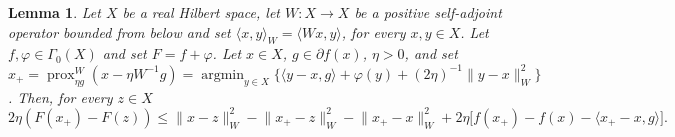 \documentclass[10pt,a4paper]{amsart}
\newtheorem{lemma}{Lemma}
\newcommand{\HH}{X}
\newcommand{\R}{\mathbb{R}}
\newcommand{\W}{W}
\DeclareMathOperator*{\argmin}{argmin}
\newcommand{\norm}[1]{\lVert{#1}\rVert}
\newcommand{\pair}[2]{{\langle{{#1},{#2}}\rangle}}
\DeclareMathOperator{\prox}{prox}
\newcommand{\reg}{\varphi}
\newcommand{\scalarp}[1]{\langle{#1}\rangle}
\newcommand{\uu}{g}
\newcommand{\x}{x}
\newcommand{\y}{y}
\begin{document}
\begin{lemma}
\label{lem:basicPGstep}
Let $X$ be a real Hilbert space,
let $\W\colon \HH\to \HH$ be a positive self-adjoint operator bounded from below and set
$\scalarp{\x,\y}_{\W} = \scalarp{\W\x,\y}$, for every $\x,\y\in \HH$.
Let $f,\reg\in \Gamma_0(X)$ and set $F = f+\reg$.
Let $x \in X$, $\uu \in \partial f(x)$, $\eta>0$, and set 
$x_+ = \prox^\W_{\eta g}(x - \eta \W^{-1}\uu) = \argmin_{\y\in \HH} \big\{ \scalarp{\y-\x, \uu} + \reg(\y)+ (2\eta)^{-1}\norm{\y-\x}_{\W}^2 \big\}$. 
Then, for every $z\in \HH$
\begin{equation}
\label{eq:basicPGstep}
2\eta (F(x_+)- F(z)) \leq \norm{x-z}_{\W}^2 - \norm{x_+-z}_{\W}^2 - \norm{x_+-x}_{\W}^2 +2\eta \big[f(x_+)-f(x)- \pair{x_+-x}{\uu}\big].
\end{equation}
\end{lemma}
\end{document}
